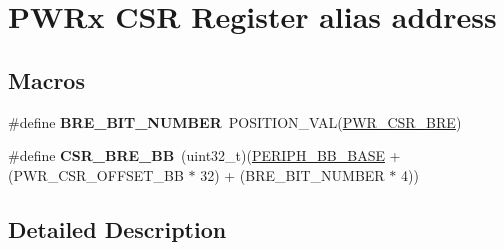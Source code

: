 \hypertarget{group___p_w_r_ex___c_s_r__register__alias}{}\section{P\+W\+Rx C\+SR Register alias address}
\label{group___p_w_r_ex___c_s_r__register__alias}
\subsection*{Macros}
\begin{DoxyCompactItemize}
\item 
\#define {\bfseries B\+R\+E\+\_\+\+B\+I\+T\+\_\+\+N\+U\+M\+B\+ER}~P\+O\+S\+I\+T\+I\+O\+N\+\_\+\+V\+AL(\hyperlink{group___peripheral___registers___bits___definition_ga0f99becaceb185431dbf46fb22718d0a}{P\+W\+R\+\_\+\+C\+S\+R\+\_\+\+B\+RE})\hypertarget{group___p_w_r_ex___c_s_r__register__alias_gabe84749fda066b71a64a1eec61032181}{}\label{group___p_w_r_ex___c_s_r__register__alias_gabe84749fda066b71a64a1eec61032181}

\item 
\#define {\bfseries C\+S\+R\+\_\+\+B\+R\+E\+\_\+\+BB}~(uint32\+\_\+t)(\hyperlink{group___peripheral__memory__map_gaed7efc100877000845c236ccdc9e144a}{P\+E\+R\+I\+P\+H\+\_\+\+B\+B\+\_\+\+B\+A\+SE} + (P\+W\+R\+\_\+\+C\+S\+R\+\_\+\+O\+F\+F\+S\+E\+T\+\_\+\+BB $\ast$ 32) + (B\+R\+E\+\_\+\+B\+I\+T\+\_\+\+N\+U\+M\+B\+ER $\ast$ 4))\hypertarget{group___p_w_r_ex___c_s_r__register__alias_ga1451a5ec810860a7c2e28c23f0c0e928}{}\label{group___p_w_r_ex___c_s_r__register__alias_ga1451a5ec810860a7c2e28c23f0c0e928}

\end{DoxyCompactItemize}


\subsection{Detailed Description}
